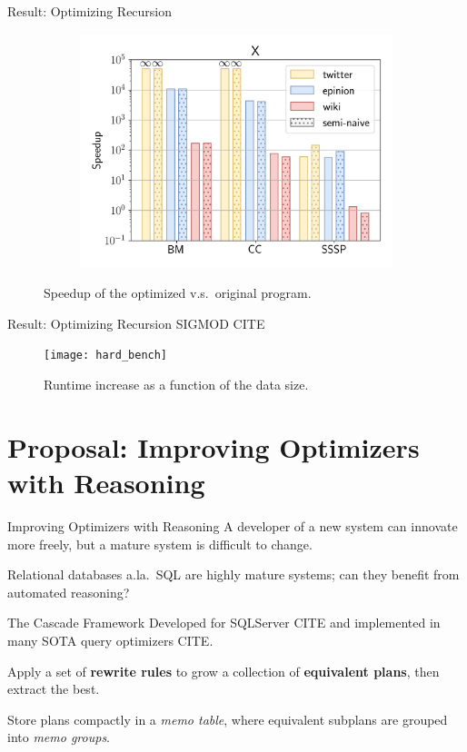 \documentclass{beamer}
\begin{document}
\begin{frame}{Result: Optimizing Recursion}
\begin{figure}
      \begin{subfigure}[b]{0.4\textwidth}
        \centering
        \includegraphics[width=\textwidth]{basic-x}
      \end{subfigure}
      \caption*{Speedup of the optimized v.s.\ original program.}
    \end{figure}    
  \end{frame}

  \begin{frame}{Result: Optimizing Recursion}
    SIGMOD CITE
    \begin{figure}
      \centering
      \texttt{[image: hard\_bench]}
      \caption*{Runtime increase as a function of the data size.}
  \end{figure} 
  \end{frame}

  \section{Proposal: Improving Optimizers with Reasoning}

  \begin{frame}{Improving Optimizers with Reasoning}
    A developer of a new system can innovate more freely, 
    but a mature system is difficult to change.

    Relational databases a.la.~SQL are highly mature systems; 
    can they benefit from automated reasoning? 
  \end{frame}

  \begin{frame}{The Cascade Framework}
    Developed for SQLServer CITE and implemented in 
    many SOTA query optimizers CITE. \pause

    Apply a set of \textbf{rewrite rules} to grow a collection 
    of \textbf{equivalent plans}, then extract the best. \pause

    Store plans compactly in a {\em memo table}, where equivalent 
    subplans are grouped into {\em memo groups}.
  \end{frame}
\end{document}
